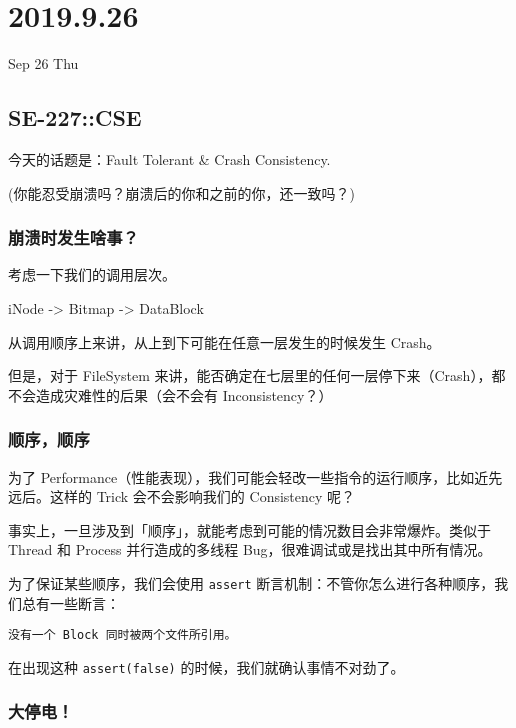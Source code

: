 \documentclass[
]{article}
\date{}
\begin{document}
\hypertarget{header-n0}{%
\section{2019.9.26}\label{header-n0}}

Sep 26 Thu

\hypertarget{header-n3}{%
\subsection{SE-227::CSE}\label{header-n3}}

今天的话题是：Fault Tolerant \& Crash Consistency.

(你能忍受崩溃吗？崩溃后的你和之前的你，还一致吗？)

\hypertarget{header-n6}{%
\subsubsection{崩溃时发生啥事？}\label{header-n6}}

考虑一下我们的调用层次。

iNode -\textgreater{} Bitmap -\textgreater{} DataBlock

从调用顺序上来讲，从上到下可能在任意一层发生的时候发生 Crash。

但是，对于 FileSystem
来讲，能否确定在七层里的任何一层停下来（Crash），都不会造成灾难性的后果（会不会有
Inconsistency？）

\hypertarget{header-n11}{%
\subsubsection{顺序，顺序}\label{header-n11}}

为了
Performance（性能表现），我们可能会轻改一些指令的运行顺序，比如近先远后。这样的
Trick 会不会影响我们的 Consistency 呢？

事实上，一旦涉及到「顺序」，就能考虑到可能的情况数目会非常爆炸。类似于
Thread 和 Process 并行造成的多线程 Bug，很难调试或是找出其中所有情况。

为了保证某些顺序，我们会使用 \texttt{assert}
断言机制：不管你怎么进行各种顺序，我们总有一些断言：

\begin{verbatim}
没有一个 Block 同时被两个文件所引用。
\end{verbatim}

在出现这种 \texttt{assert(false)} 的时候，我们就确认事情不对劲了。

\hypertarget{header-n17}{%
\subsubsection{大停电！}\label{header-n17}}
\end{document}
